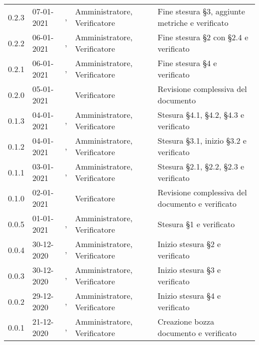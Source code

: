 {\begin{longtable}{C{1.7cm} C{2.5cm} C{3.2cm} C{2.9cm} C{4.6cm}}
0.2.3 & 07-01-2021 & \ZM{}, \BM{} & Amministratore, Verificatore & Fine stesura \S 3, aggiunte metriche e verificato\\
0.2.2 & 06-01-2021 & \PA{}, \SP{} & Amministratore, Verificatore & Fine stesura \S 2 con \S 2.4 e verificato\\
0.2.1 & 06-01-2021 & \RA{}, \BM{} & Amministratore, Verificatore & Fine stesura \S 4 e verificato\\
0.2.0 & 05-01-2021 & \BM{} & Verificatore & Revisione complessiva del documento \\
0.1.3 & 04-01-2021 & \RA{}, \SP{} & Amministratore, Verificatore & Stesura \S 4.1, \S 4.2, \S 4.3 e verificato\\
0.1.2 & 04-01-2021 & \ZM{}, \BM{} & Amministratore, Verificatore & Stesura \S 3.1, inizio \S 3.2 e verificato\\
0.1.1 & 03-01-2021 & \PA{}, \SP{} & Amministratore, Verificatore & Stesura \S 2.1, \S 2.2, \S 2.3 e verificato\\
0.1.0 & 02-01-2021 & \BM{} & Verificatore & Revisione complessiva del documento e verificato\\
0.0.5 & 01-01-2021 & \ZM{}, \SP{} & Amministratore, Verificatore & Stesura \S 1 e verificato\\
0.0.4 & 30-12-2020 & \PA{}, \SP{} & Amministratore, Verificatore & Inizio stesura \S 2 e verificato\\
0.0.3 & 30-12-2020 & \ZM{}, \BM{} & Amministratore, Verificatore & Inizio stesura \S 3 e verificato\\
0.0.2 & 29-12-2020 & \RA{}, \SP{} & Amministratore, Verificatore & Inizio stesura \S 4 e verificato\\
0.0.1 & 21-12-2020 & \ZM{}, \BM{} & Amministratore, Verificatore & Creazione bozza documento e verificato\\	
\end{longtable}
}
